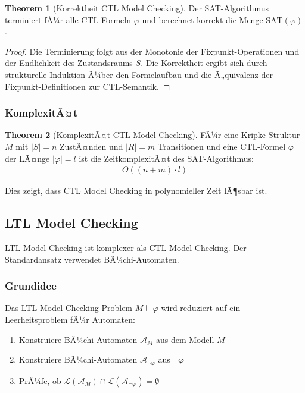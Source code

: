 ﻿\documentclass[a4paper,12pt]{article}
\theoremstyle{definition}
\newtheorem{theorem}{Theorem}[section]
\begin{document}
\begin{theorem}[Korrektheit CTL Model Checking]
	Der SAT-Algorithmus terminiert fÃ¼r alle CTL-Formeln $\varphi$ und berechnet korrekt die Menge $\text{SAT}(\varphi)$.
\end{theorem}

\begin{proof}
	Die Terminierung folgt aus der Monotonie der Fixpunkt-Operationen und der Endlichkeit des Zustandsraums $S$. Die Korrektheit ergibt sich durch strukturelle Induktion Ã¼ber den Formelaufbau und die Ã„quivalenz der Fixpunkt-Definitionen zur CTL-Semantik.
\end{proof}

\subsubsection{KomplexitÃ¤t}

\begin{theorem}[KomplexitÃ¤t CTL Model Checking]
	FÃ¼r eine Kripke-Struktur $M$ mit $|S| = n$ ZustÃ¤nden und $|R| = m$ Transitionen und eine CTL-Formel $\varphi$ der LÃ¤nge $|\varphi| = l$ ist die ZeitkomplexitÃ¤t des SAT-Algorithmus:
	\begin{align}
	O((n + m) \cdot l)
	\end{align}
\end{theorem}

Dies zeigt, dass CTL Model Checking in polynomieller Zeit lÃ¶sbar ist.

\subsection{LTL Model Checking}

LTL Model Checking ist komplexer als CTL Model Checking. Der Standardansatz verwendet BÃ¼chi-Automaten.

\subsubsection{Grundidee}

Das LTL Model Checking Problem $M \models \varphi$ wird reduziert auf ein Leerheitsproblem fÃ¼r Automaten:
\begin{enumerate}
	\item Konstruiere BÃ¼chi-Automaten $\mathcal{A}_M$ aus dem Modell $M$
	\item Konstruiere BÃ¼chi-Automaten $\mathcal{A}_{\neg\varphi}$ aus $\neg\varphi$
	\item PrÃ¼fe, ob $\mathcal{L}(\mathcal{A}_M) \cap \mathcal{L}(\mathcal{A}_{\neg\varphi}) = \emptyset$
\end{enumerate}
\end{document}
